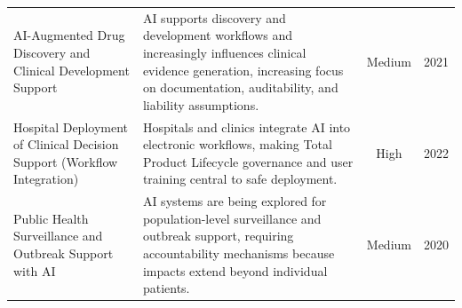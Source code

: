 \begin{longtable}{@{}p{4.2cm} p{7.8cm} c c@{}}
AI-Augmented Drug Discovery and Clinical Development Support & AI supports discovery and development workflows and increasingly influences clinical evidence generation, increasing focus on documentation, auditability, and liability assumptions. & Medium & 2021 \\
Hospital Deployment of Clinical Decision Support (Workflow Integration) & Hospitals and clinics integrate AI into electronic workflows, making Total Product Lifecycle governance and user training central to safe deployment. & High & 2022 \\
Public Health Surveillance and Outbreak Support with AI & AI systems are being explored for population-level surveillance and outbreak support, requiring accountability mechanisms because impacts extend beyond individual patients. & Medium & 2020 \\
\end{longtable}